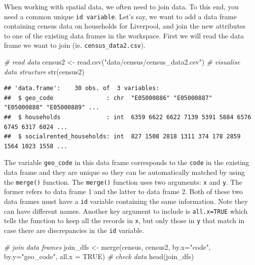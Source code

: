 \documentclass[
]{book}
\newenvironment{Shaded}{\begin{snugshade}}{\end{snugshade}}
\newcommand{\AttributeTok}[1]{\textcolor[rgb]{0.77,0.63,0.00}{#1}}
\newcommand{\CommentTok}[1]{\textcolor[rgb]{0.56,0.35,0.01}{\textit{#1}}}
\newcommand{\ConstantTok}[1]{\textcolor[rgb]{0.00,0.00,0.00}{#1}}
\newcommand{\FunctionTok}[1]{\textcolor[rgb]{0.00,0.00,0.00}{#1}}
\newcommand{\NormalTok}[1]{#1}
\newcommand{\OtherTok}[1]{\textcolor[rgb]{0.56,0.35,0.01}{#1}}
\newcommand{\StringTok}[1]{\textcolor[rgb]{0.31,0.60,0.02}{#1}}
\begin{document}
When working with spatial data, we often need to join data. To this end, you need a common unique \texttt{id\ variable}. Let's say, we want to add a data frame containing census data on households for Liverpool, and join the new attributes to one of the existing data frames in the workspace. First we will read the data frame we want to join (ie. \texttt{census\_data2.csv}).

\begin{Shaded}
\begin{Highlighting}[]
\CommentTok{\# read data}
\NormalTok{census2 }\OtherTok{\textless{}{-}} \FunctionTok{read.csv}\NormalTok{(}\StringTok{"data/census/census\_data2.csv"}\NormalTok{)}
\CommentTok{\# visualise data structure}
\FunctionTok{str}\NormalTok{(census2)}
\end{Highlighting}
\end{Shaded}

\begin{verbatim}
## 'data.frame':    30 obs. of  3 variables:
##  $ geo_code               : chr  "E05000886" "E05000887" "E05000888" "E05000889" ...
##  $ households             : int  6359 6622 6622 7139 5391 5884 6576 6745 6317 6024 ...
##  $ socialrented_households: int  827 1508 2818 1311 374 178 2859 1564 1023 1558 ...
\end{verbatim}

The variable \texttt{geo\_code} in this data frame corresponds to the \texttt{code} in the existing data frame and they are unique so they can be automatically matched by using the \texttt{merge()} function. The \texttt{merge()} function uses two arguments: \texttt{x} and \texttt{y}. The former refers to data frame 1 and the latter to data frame 2. Both of these two data frames must have a \texttt{id} variable containing the same information. Note they can have different names. Another key argument to include is \texttt{all.x=TRUE} which tells the function to keep all the records in \texttt{x}, but only those in \texttt{y} that match in case there are discrepancies in the \texttt{id} variable.

\begin{Shaded}
\begin{Highlighting}[]
\CommentTok{\# join data frames}
\NormalTok{join\_dfs }\OtherTok{\textless{}{-}} \FunctionTok{merge}\NormalTok{(census, census2, }\AttributeTok{by.x=}\StringTok{"code"}\NormalTok{, }\AttributeTok{by.y=}\StringTok{"geo\_code"}\NormalTok{, }\AttributeTok{all.x =} \ConstantTok{TRUE}\NormalTok{)}
\CommentTok{\# check data}
\FunctionTok{head}\NormalTok{(join\_dfs)}
\end{Highlighting}
\end{Shaded}
\end{document}
